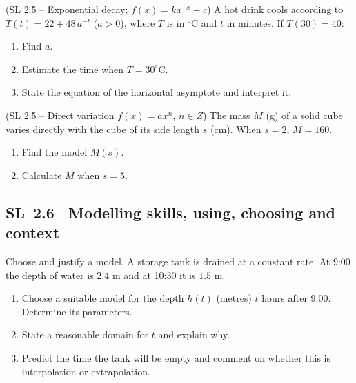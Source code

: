 \documentclass[11pt]{article}
\def\textbf#1{#1}%
\def\textit#1{#1}%
\def\mathbb#1{#1}%
\newcommand{\tocsubsection}[1]{\subsection{#1}}
\newcounter{question}
\begin{document}
\begin{question}
\textit{(SL 2.5 – Exponential decay; $f(x)=ka^{-x}+c$)}
A hot drink cools according to $T(t)=22+48\,a^{-t}$ ($a>0$), where $T$ is in $^\circ$C and $t$ in minutes. If $T(30)=40$:
\begin{enumerate}
  \item Find $a$.
  \item Estimate the time when $T=30^\circ$C.
  \item State the equation of the horizontal asymptote and interpret it.
\end{enumerate}
\end{question}

\begin{question}
\textit{(SL 2.5 – Direct variation $f(x)=ax^n$, $n\in\mathbb Z$)}
The mass $M$ (g) of a solid cube varies directly with the cube of its side length $s$ (cm). When $s=2$, $M=160$.
\begin{enumerate}
  \item Find the model $M(s)$.
  \item Calculate $M$ when $s=5$.
\end{enumerate}
\end{question}






















\tocsubsection{SL 2.6 \; Modelling skills, using, choosing and context}


\begin{question}
\textbf{Choose and justify a model.}
A storage tank is drained at a constant rate. At 9:00 the depth of water is $2.4$ m and at 10:30 it is $1.5$ m.
\begin{enumerate}
  \item Choose a suitable model for the depth $h(t)$ (metres) $t$ hours after 9:00. Determine its parameters.
  \item State a reasonable domain for $t$ and explain why.
  \item Predict the time the tank will be empty and comment on whether this is interpolation or extrapolation.
\end{enumerate}
\end{question}
\end{document}
